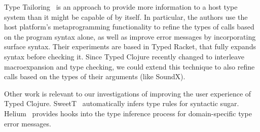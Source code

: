 \documentclass[11pt]{iuthesis}
\begin{document}
Type Tailoring~\cite{greenmanttailoring} is an approach to provide more information
to a host type system than it might be capable of by itself.
In particular, the authors use the host platform's metaprogramming functionality
to refine the types of calls based on the program syntax alone, as well as improve
error messages by incorporating surface syntax. Their experiments are based in Typed Racket, that fully expands
syntax before checking it. Since Typed Clojure recently changed to interleave macroexpansion
and type checking, we could extend this technique to also refine calls based on the
types of their arguments (like SoundX).


Other work is relevant to our investigations of improving the user experience
of Typed Clojure. SweetT~\cite{pombrio2018inferring} automatically infers type rules
for syntactic sugar. Helium~\cite{Heeren2003STI} provides hooks into the type inference
process for domain-specific type error messages.

\printbibliography


\newpage

\end{document}
